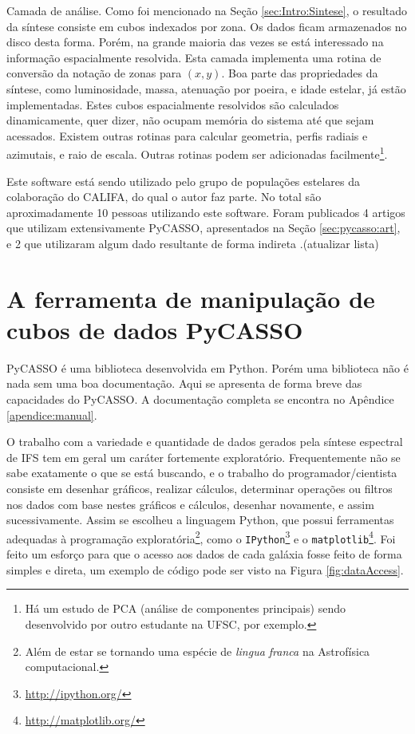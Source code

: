 Camada de análise. Como foi mencionado na Seção \ref{sec:Intro:Sintese}, o
resultado da síntese consiste em cubos indexados por zona. Os dados ficam
armazenados no disco desta forma. Porém, na grande maioria das vezes se está
interessado na informação espacialmente resolvida. Esta camada implementa uma rotina de
conversão da notação de zonas para $(x, y)$. Boa parte das propriedades da
síntese, como luminosidade, massa, atenuação por poeira, e idade estelar, já
estão implementadas. Estes cubos espacialmente resolvidos são calculados
dinamicamente, quer dizer, não ocupam memória do sistema até que sejam
acessados. Existem outras rotinas para calcular geometria, perfis radiais e
azimutais, e raio de escala. Outras rotinas podem ser adicionadas
facilmente\footnote{Há um estudo de PCA (análise de componentes principais)
sendo desenvolvido por outro estudante na UFSC, por exemplo.}.

Este software está sendo utilizado pelo grupo de populações estelares da
colaboração do CALIFA, do qual o autor faz parte. No total são aproximadamente
10 pessoas utilizando este software. Foram publicados 4 artigos que utilizam
extensivamente PyCASSO, apresentados na Seção \ref{sec:pycasso:art}, e 2 que
utilizaram algum dado resultante de forma indireta \citep{Husemann2013,
IglesiasParamo2013}.\fixme (atualizar lista)



\section{A ferramenta de manipulação de cubos de dados PyCASSO}
\label{sec:pycasso:Pycasso}

PyCASSO é uma biblioteca desenvolvida em Python. Porém uma biblioteca não é nada
sem uma boa documentação. Aqui se apresenta de forma breve das capacidades do
PyCASSO. A documentação completa se encontra no Apêndice \ref{apendice:manual}.

O trabalho com a variedade e quantidade de dados gerados pela síntese espectral
de IFS tem em geral um caráter fortemente exploratório. Frequentemente não se
sabe exatamente o que se está buscando, e o trabalho do programador/cientista
consiste em desenhar gráficos, realizar cálculos, determinar operações ou
filtros nos dados com base nestes gráficos e cálculos, desenhar novamente, e
assim sucessivamente. Assim se escolheu a linguagem Python, que possui
ferramentas adequadas à programação exploratória\footnote{Além de estar se
tornando uma espécie de {\em lingua franca} na Astrofísica computacional.}, como
o \texttt{IPython}\footnote{\url{http://ipython.org/}} e o
\texttt{matplotlib}\footnote{\url{http://matplotlib.org/}}. Foi feito um esforço
para que o acesso aos dados de cada galáxia fosse feito de forma simples e
direta, um exemplo de código pode ser visto na Figura \ref{fig:dataAccess}.

